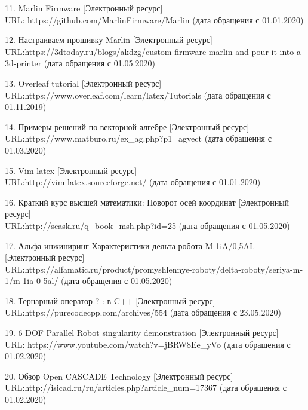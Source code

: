 11. Marlin Firmware [Электронный ресурс] \\ URL: https://github.com/MarlinFirmware/Marlin (дата обращения с 01.01.2020)


12. Настраиваем прошивку Marlin  [Электронный ресурс] \\ URL:https://3dtoday.ru/blogs/akdzg/custom-firmware-marlin-and-pour-it-into-a-3d-printer  (дата обращения с 01.05.2020)


13. Overleaf tutorial  [Электронный ресурс] \\ URL:https://www.overleaf.com/learn/latex/Tutorials  (дата обращения с 01.11.2019)


14. Примеры решений по векторной алгебре [Электронный ресурс] \\ URL:https://www.matburo.ru/ex\_ag.php?p1=agvect  (дата обращения с 01.03.2020)


15. Vim-latex [Электронный ресурс] \\ URL:http://vim-latex.sourceforge.net/  (дата обращения с 01.01.2020)


16. Краткий курс высшей математики: Поворот осей координат [Электронный ресурс] \\ URL:http://scask.ru/q\_book\_msh.php?id=25  (дата обращения с 01.05.2020)


17. Альфа-инжиниринг Характеристики дельта-робота M-1iA/0,5AL [Электронный ресурс] \\ URL:https://alfamatic.ru/product/promyshlennye-roboty/delta-roboty/seriya-m-1/m-1ia-0-5al/  (дата обращения с 01.05.2020)


18. Тернарный оператор ? : в C++ [Электронный ресурс] \\ URL:https://purecodecpp.com/archives/554  (дата обращения с 23.05.2020)


19. 6 DOF Parallel Robot singularity demonstration  [Электронный ресурс] \\ URL: https://www.youtube.com/watch?v=jBRW8Ee\_yVo (дата обращения с 01.02.2020)

20. Обзор Open CASCADE Technology  [Электронный ресурс] \\ URL:http://isicad.ru/ru/articles.php?article\_num=17367  (дата обращения с 01.02.2020)

